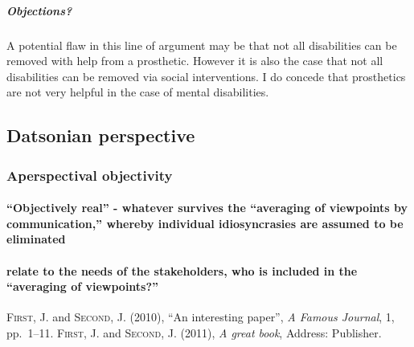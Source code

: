 \documentclass[a4paper]{article}
\begin{document}
\subparagraph{Objections?}

A potential flaw in this line of argument may be that not all disabilities can
be removed with help from a prosthetic. However it is also the case that not
all disabilities can be removed via social interventions. I do concede that
prosthetics are not very helpful in the case of mental disabilities. 


\subsection{Datsonian perspective}

\subsubsection{Aperspectival objectivity}

\paragraph{``Objectively real'' - whatever survives the ``averaging of viewpoints
by communication,'' whereby individual idiosyncrasies are assumed to be
eliminated}

\paragraph{relate to the needs of the stakeholders, who is included in the
``averaging of viewpoints?''}





\begin{thebibliography}{AAA}
 \textsc{First, J.} and \textsc{Second, J.} (2010), ``An interesting paper'', \emph{A Famous Journal}, 1, pp.~1--11.
 \textsc{First, J.} and \textsc{Second, J.} (2011), \emph{A great book}, Address: Publisher.
\end{thebibliography}
\end{document}
